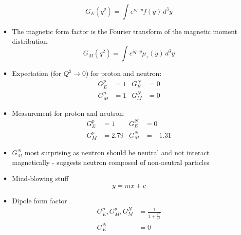\documentclass[a4paper, 11pt, normalem]{report}
\begin{document}
\begin{itemize}
        \begin{equation}
            G_E(q^2) = \int e^{iq\cdot y}f(y)\,d^3y
        \end{equation}
    \item The magnetic form factor is the Fourier transform of the magnetic moment distribution. 
        \begin{equation}
            G_M(q^2) = \int e^{iq\cdot y}\mu_z(y)\,d^3y
        \end{equation}
    \item Expectation (for $Q^2 \to 0$) for proton and neutron:
        \begin{align}
            G_E^p &= 1 & G_E^N &= 0 \\
            G_M^p &= 1 & G_M^N &= 0 
        \end{align}
    \item Measurement for proton and neutron:
        \begin{align}
            G_E^p &= 1 & G_E^N &= 0 \\
            G_M^p &= 2.79 & G_M^N &=-1.31
        \end{align}
    \item $G_M^N$ most surprising as neutron should be neutral and not interact magnetically - suggests neutron composed of non-neutral particles
    \item Mind-blowing stuff
        \begin{equation}
            y = mx + c
        \end{equation}
    \item Dipole form factor 
        \begin{align}
            G_E^p, G_M^p, G_M^N &= \frac{1}{1 + \frac{q^2}{a^2}} \\
            G_E^N &= 0
        \end{align}
\end{itemize}

\chapter{}

\chapter{}
\end{document}
